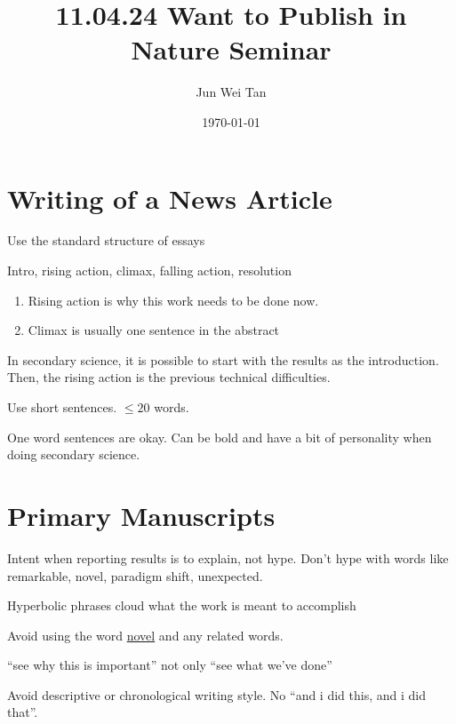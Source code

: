\documentclass[prb,12pt]{revtex4-2}
\theoremstyle{definition}
\theoremstyle{definition}
\begin{document}
\title{11.04.24 Want to Publish in Nature Seminar}
	\author{Jun Wei Tan}
	\date{\today}
	\maketitle

	\section{Writing of a News Article}
	Use the standard structure of essays

	Intro, rising action, climax, falling action, resolution
\begin{enumerate}
\item Rising action is why this work needs to be done now.
\item Climax is usually one sentence in the abstract 
\end{enumerate}

In secondary science, it is possible to start with the results as the introduction. Then, the rising action is the previous technical difficulties.

\begin{tcolorbox}
	Use short sentences. $\le 20$ words.
\end{tcolorbox}
One word sentences are okay. Can be bold and have a bit of personality when doing secondary science.

\section{Primary Manuscripts}

Intent when reporting results is to explain, not hype. Don't hype with words like remarkable, novel, paradigm shift, unexpected. 

Hyperbolic phrases cloud what the work is meant to accomplish

Avoid using the word \underline{novel} and any related words.

``see why this is important'' not only ``see what we've done''

Avoid descriptive or chronological writing style. No ``and i did this, and i did that''.
\end{document}
